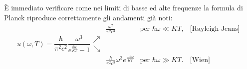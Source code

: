 \documentclass[a4paper,12pt,oneside]{book}
\begin{document}
È immediato verificare come nei limiti di basse ed alte frequenze la formula di Planck riproduce correttamente gli andamenti già noti:\\
\begin{equation}
u(\omega , T) =\frac{\hbar}{\pi ^2 c^2} \frac{\omega ^3}{e^{\frac{\hbar \omega}{KT}} -1} 
\begin{array}{clcc}
 & \displaystyle{\frac{\omega ^2}{\pi ^2 c^3} } & \textrm{per } \hbar \omega \ll KT, & \textrm{[Rayleigh-Jeans]}\\
\nearrow \\
\searrow \\
 & \displaystyle{\frac{h}{\pi ^2 c^3}\omega ^3 e^{\frac{-\hbar \omega}{KT}}} & \textrm{per }  \hbar \omega \gg KT .& \textrm{[Wien]}
\end{array}
\end{equation}
\end{document}

